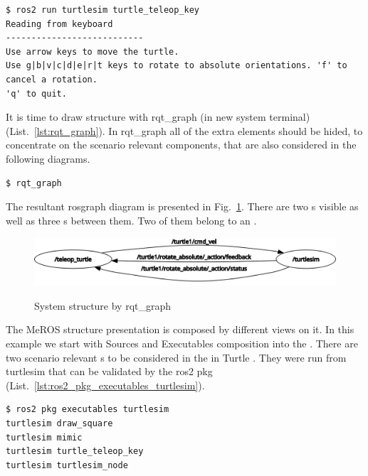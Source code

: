 \documentclass[11pt,oneside,a4paper]{report}
\begin{document}
\begin{lstlisting}[style=terminal,label={lst:ros2_run_turtle_teleop_key},caption={ros2 run turtlesim turtle\_teleop\_key}]
$ ros2 run turtlesim turtle_teleop_key
Reading from keyboard
---------------------------
Use arrow keys to move the turtle.
Use g|b|v|c|d|e|r|t keys to rotate to absolute orientations. 'f' to cancel a rotation.
'q' to quit.
\end{lstlisting}

It is time to draw \stSystem{} structure with \textsf{rqt\_graph} \stCLTool{} (in new system terminal)  (List.~\ref{lst:rqt_graph}). In rqt\_graph all of the extra elements should be hided, to concentrate on the scenario relevant \stSystem{} components, that are also considered in the following diagrams.

\begin{lstlisting}[style=terminal,label={lst:rqt_graph},caption={rqt\_graph}]
$ rqt_graph
\end{lstlisting}

The resultant rosgraph diagram is presented in Fig.~\ref{fig:rqt_graph}. There are two \stNode{}s visible as well as three \stTopic{}s between them. Two of them belong to an \stAction{}.

\begin{figure}[H]
	\centering
	\begin{center}
		{\includegraphics[scale=.5]{diagrams/rosgraph.png}}
	\end{center}
	\caption{System structure by rqt\_graph}
	\label{fig:rqt_graph}
\end{figure}

The MeROS \stSystem{} structure presentation is composed by different views on it. In this example we start with Sources and Executables composition into the \stSystem{}. There are two scenario relevant \stNode{}s to be considered in the in \textsf{Turtle} \stSystem{}. They were run from \textsf{turtlesim} \stPackage{} that can be validated by the \textsf{ros2 pkg} \stCLTool{} (List.~\ref{lst:ros2_pkg_executables_turtlesim}).

\begin{lstlisting}[style=terminal,label={lst:ros2_pkg_executables_turtlesim},caption={ros2 pkg executables turtlesim}]
$ ros2 pkg executables turtlesim
turtlesim draw_square
turtlesim mimic
turtlesim turtle_teleop_key
turtlesim turtlesim_node
\end{lstlisting}
\end{document}
